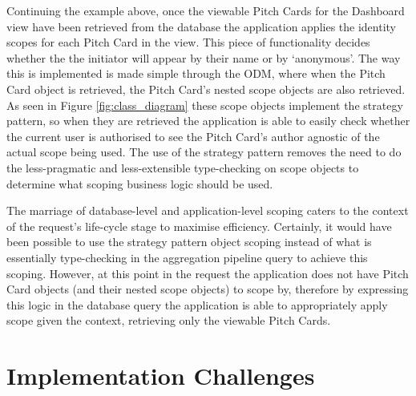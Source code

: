 Continuing the example above, once the viewable Pitch Cards for the Dashboard view have been retrieved from the database the application applies the identity scopes for each Pitch Card in the view. This piece of functionality decides whether the the initiator will appear by their name or by `anonymous'. The way this is implemented is made simple through the ODM, where when the Pitch Card object is retrieved, the Pitch Card's nested scope objects are also retrieved. As seen in Figure \ref{fig:class_diagram} these scope objects implement the strategy pattern, so when they are retrieved the application is able to easily check whether the current user is authorised to see the Pitch Card's author agnostic of the actual scope being used. The use of the strategy pattern removes the need to do the less-pragmatic and less-extensible type-checking on scope objects to determine what scoping business logic should be used.
\par
The marriage of database-level and application-level scoping caters to the context of the request's life-cycle stage to maximise efficiency. Certainly, it would have been possible to use the strategy pattern object scoping instead of what is essentially type-checking in the aggregation pipeline query to achieve this scoping. However, at this point in the request the application does not have Pitch Card objects (and their nested scope objects) to scope by, therefore by expressing this logic in the database query the application is able to appropriately apply scope given the context, retrieving only the viewable Pitch Cards.

\section{Implementation Challenges}

